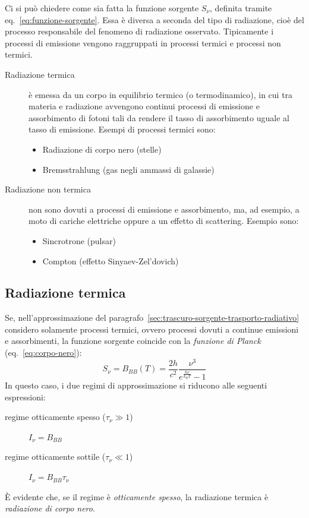 Ci si può chiedere come sia fatta la funzione sorgente $S_\nu$, definita tramite eq.~\eqref{eq:funzione-sorgente}. Essa è diversa a seconda del tipo di radiazione, cioè del processo responsabile del fenomeno di radiazione osservato. Tipicamente i processi di emissione vengono raggruppati in processi termici e processi non termici.
\begin{description}
    \item[Radiazione termica] è emessa da un corpo in equilibrio termico (o termodinamico), in cui tra materia e radiazione avvengono continui processi di emissione e assorbimento di fotoni tali da rendere il tasso di assorbimento uguale al tasso di emissione. Esempi di processi termici sono:
    \begin{itemize}
        \item Radiazione di corpo nero (stelle)
        \item Bremsstrahlung (gas negli ammassi di galassie)
    \end{itemize}
    
    \item[Radiazione non termica] non sono dovuti a processi di emissione e assorbimento, ma, ad esempio, a moto di cariche elettriche oppure a un effetto di scattering. Esempio sono:
    \begin{itemize}
        \item Sincrotrone (pulsar)
        \item Compton (effetto Sinyaev-Zel'dovich)
    \end{itemize}
\end{description}

\subsection{Radiazione termica}
Se, nell'approssimazione del paragrafo~\ref{sec:trascuro-sorgente-trasporto-radiativo} considero solamente processi termici, ovvero processi dovuti a continue emissioni e assorbimenti, la funzione sorgente coincide con la \emph{funzione di Planck} (eq.~\eqref{eq:corpo-nero}):
\[
    S_\nu = B_{BB} (T) = \frac{2 h}{c^2} \frac{\nu^3}{e^{\frac{h \nu}{k_B T}} - 1}
\]
In questo caso, i due regimi di approssimazione si riducono alle seguenti espressioni:
\begin{description}
    \item[regime otticamente spesso ($\tau_\nu \gg 1$)] $I_\nu = B_{BB}$
    \item[regime otticamente sottile ($\tau_\nu \ll 1$)] $I_\nu = B_{BB} \tau_\nu$
\end{description}
È evidente che, se il regime è \emph{otticamente spesso}, la radiazione termica è \emph{radiazione di corpo nero}.
